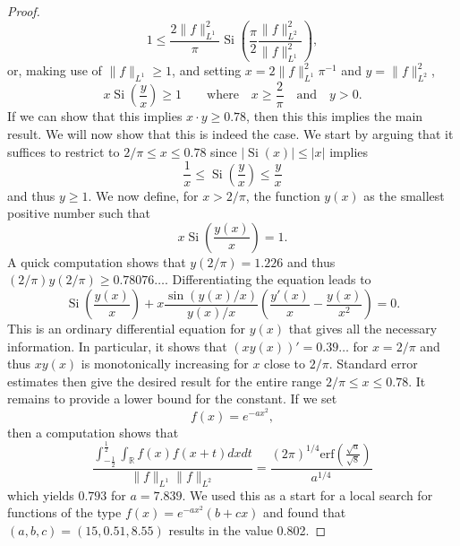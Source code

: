 \documentclass{amsart}
\theoremstyle{remark}
\DeclareMathOperator{\Si}{Si}
\begin{document}
{\begin{proof}
$$ 1 \leq  \frac{2 \|f\|_{L^1}^2}{\pi} \Si\left( \frac{\pi}{2} \frac{\|f\|_{L^2}^2}{\|f\|_{L^1}^2}\right),$$
or, making use of $\|f\|_{L^1} \geq 1$, and setting $x = 2 \|f\|_{L^1}^2 \pi^{-1}$ and $y = \|f\|_{L^2}^2$,
$$ x \Si\left(\frac{y}{x}\right) \geq 1 \qquad \mbox{where} \quad x \geq \frac{2}{\pi} \quad \mbox{and} \quad y > 0.$$
If we can show that this implies $x \cdot y  \geq 0.78$, then this this implies the main result.  We will now show that
this is indeed the case. We start by arguing that it suffices to restrict to $2/\pi \leq x \leq 0.78$ since $|\Si(x)| \leq |x|$ implies
$$ \frac{1}{x} \leq \Si\left(\frac{y}{x}\right)  \leq \frac{y}{x}$$
and thus $y \geq 1$. We now define, for $x > 2/\pi$, the function $y(x)$ as the smallest positive number such that
$$ x \Si\left(\frac{y(x)}{x}\right) = 1.$$
A quick computation shows that $y(2/\pi) = 1.226$ and thus $(2/\pi) y(2/\pi) \geq 0.78076\dots$. Differentiating the equation leads to
$$  \Si\left(\frac{y(x)}{x}\right) + x \frac{\sin{(y(x)/x)}}{y(x)/x}\left( \frac{y'(x)}{x} - \frac{y(x)}{x^2}\right) = 0.$$
This is an ordinary differential equation for $y(x)$ that gives all the necessary information. In particular, it shows that $(x y(x))' = 0.39\dots$ for $x= 2/\pi$
and thus $x y(x)$ is monotonically increasing for $x$ close to $2/\pi$. Standard error estimates then give the desired result for the entire range $2/\pi \leq x \leq 0.78$.
It remains to provide a lower bound for the constant.
If we set
$$ f(x) = e^{-a x^2},$$
then a computation shows that
$$ \frac{\int_{-\frac{1}{2}}^{\frac{1}{2}}{ \int_{\mathbb{R}}{f(x) f(x+t) dx}dt}}{\|f\|_{L^1}\|f\|_{L^2}} = \frac{(2 \pi)^{1/4} \mbox{erf}\left(\frac{\sqrt{a}}{\sqrt{8}}\right)}{a^{1/4}}$$
which yields $0.793$ for $a=7.839$. We used this as a start for a local search for functions of the type $f(x) = e^{-a x^2}(b + cx)$ and found that
$(a,b,c) = (15, 0.51, 8.55)$ results in the value 0.802.
\end{proof}

}
\end{document}
